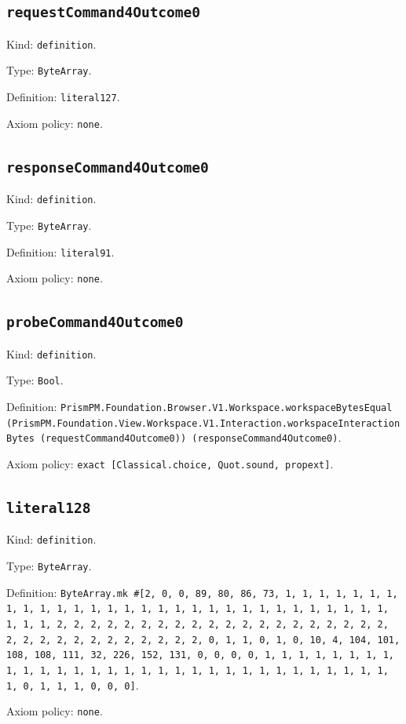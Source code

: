 \documentclass[11pt]{article}
\begin{document}
\subsection*{\texttt{requestCommand4Outcome0}}
\noindent Kind: \texttt{definition}.\par
\noindent Type: \texttt{ByteArray}.\par
\noindent Definition: \texttt{literal127}.\par
\noindent Axiom policy: \texttt{none}.\par
\subsection*{\texttt{responseCommand4Outcome0}}
\noindent Kind: \texttt{definition}.\par
\noindent Type: \texttt{ByteArray}.\par
\noindent Definition: \texttt{literal91}.\par
\noindent Axiom policy: \texttt{none}.\par
\subsection*{\texttt{probeCommand4Outcome0}}
\noindent Kind: \texttt{definition}.\par
\noindent Type: \texttt{Bool}.\par
\noindent Definition: \texttt{PrismPM.Foundation.Browser.V1.Workspace.workspaceBytesEqual (PrismPM.Foundation.View.Workspace.V1.Interaction.workspaceInteractionBytes (requestCommand4Outcome0)) (responseCommand4Outcome0)}.\par
\noindent Axiom policy: \texttt{exact [Classical.choice, Quot.sound, propext]}.\par
\subsection*{\texttt{literal128}}
\noindent Kind: \texttt{definition}.\par
\noindent Type: \texttt{ByteArray}.\par
\noindent Definition: \texttt{ByteArray.mk \#[2, 0, 0, 89, 80, 86, 73, 1, 1, 1, 1, 1, 1, 1, 1, 1, 1, 1, 1, 1, 1, 1, 1, 1, 1, 1, 1, 1, 1, 1, 1, 1, 1, 1, 1, 1, 1, 1, 1, 1, 2, 2, 2, 2, 2, 2, 2, 2, 2, 2, 2, 2, 2, 2, 2, 2, 2, 2, 2, 2, 2, 2, 2, 2, 2, 2, 2, 2, 2, 2, 2, 2, 0, 1, 1, 0, 1, 0, 10, 4, 104, 101, 108, 108, 111, 32, 226, 152, 131, 0, 0, 0, 0, 1, 1, 1, 1, 1, 1, 1, 1, 1, 1, 1, 1, 1, 1, 1, 1, 1, 1, 1, 1, 1, 1, 1, 1, 1, 1, 1, 1, 1, 1, 1, 1, 0, 1, 1, 1, 0, 0, 0]}.\par
\noindent Axiom policy: \texttt{none}.\par
\end{document}
